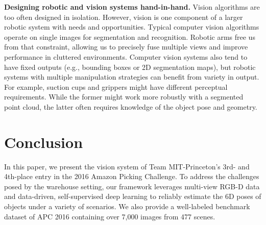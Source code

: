 \documentclass[letterpaper, 10 pt, conference]{ieeeconf}  %
\newcommand{\myparagraph}[1]{\vspace{0.1in}\noindent\textbf{#1}}
\begin{document}
\myparagraph{Designing robotic and vision systems hand-in-hand.}
Vision algorithms are too often designed in isolation.
However, vision is one component of a larger robotic system with needs and opportunities.
Typical computer vision algorithms operate on single images for segmentation and recognition. Robotic arms free us from that constraint, allowing us to precisely fuse multiple views and improve performance in cluttered environments.
Computer vision systems also tend to have fixed outputs (e.g., bounding boxes or 2D segmentation maps), but robotic systems with multiple manipulation strategies can benefit from variety in output. For example, suction cups and grippers might have different perceptual requirements. While the former might work more robustly with a segmented point cloud, the latter often requires knowledge of the object pose and geometry.
  
\iffalse
\myparagraph{Trade off between different vision outputs; i move to see i see to move; work hand in hand with robotics; note to vision researchers forget that part of larger systems; often forget details} For many robotic tasks, accurate 6D object poses can enable finer degrees of manipulation, such as grasping or scooping. While on the other hand, such high fidelity visual information may not be entirely necessary for using suction for picking. Our robot system uses primitives from both ends of this spectrum, depending on the target object at hand. To this end, in addition to predicted object poses, our vision system returns other pieces of intermediate information such as segmented point cloud bounding boxes, surface point cloud principal components, that may be more reliable (Table \ref{table:seg} and \ref{table:pose} ) and useful for primitives like suction and deformable and thin objects.

\myparagraph{Find opportunities to self supervise}
\myparagraph{Find ways to get more information} 
The extra amount of data we are able to get during training and testing phase plays a critical role in helping the system achieving better performance, by providing more information.
During training we achieve data diversity by using self supervised method to generate large amount of training data that enables us to train a high capacity model to deal with object and pose variation
During testing, we diverse our input data using that significantly increase the robustness of the algorithm under occlusion and clutter.
\fi

\section{Conclusion} %
In this paper, we present the vision system of Team MIT-Princeton's 3rd- and 4th-place entry in the 2016 Amazon Picking Challenge. To address the challenges posed by the warehouse setting, our framework leverages multi-view RGB-D data and data-driven, self-supervised deep learning to reliably estimate the 6D poses of objects under a variety of scenarios. We also provide a well-labeled benchmark dataset of APC 2016 containing over 7,000 images from 477 scenes.
\iffalse
\end{document}

